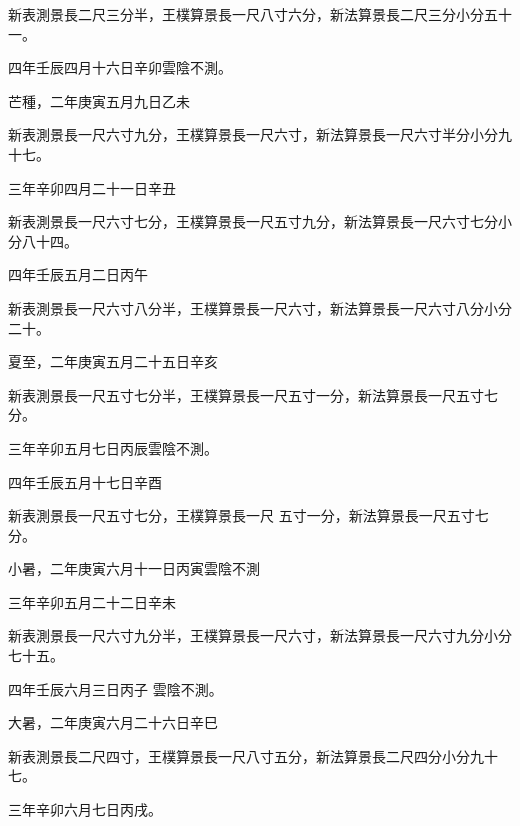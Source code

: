 \begin{pinyinscope}
 新表測景長二尺三分半，王樸算景長一尺八寸六分，新法算景長二尺三分小分五十一。



 四年壬辰四月十六日辛卯雲陰不測。



 芒種，二年庚寅五月九日乙未



 新表測景長一尺六寸九分，王樸算景長一尺六寸，新法算景長一尺六寸半分小分九十七。



 三年辛卯四月二十一日辛丑



 新表測景長一尺六寸七分，王樸算景長一尺五寸九分，新法算景長一尺六寸七分小分八十四。



 四年壬辰五月二日丙午



 新表測景長一尺六寸八分半，王樸算景長一尺六寸，新法算景長一尺六寸八分小分二十。



 夏至，二年庚寅五月二十五日辛亥



 新表測景長一尺五寸七分半，王樸算景長一尺五寸一分，新法算景長一尺五寸七分。



 三年辛卯五月七日丙辰雲陰不測。



 四年壬辰五月十七日辛酉



 新表測景長一尺五寸七分，王樸算景長一尺
 五寸一分，新法算景長一尺五寸七分。



 小暑，二年庚寅六月十一日丙寅雲陰不測



 三年辛卯五月二十二日辛未



 新表測景長一尺六寸九分半，王樸算景長一尺六寸，新法算景長一尺六寸九分小分七十五。



 四年壬辰六月三日丙子
 雲陰不測。



 大暑，二年庚寅六月二十六日辛巳



 新表測景長二尺四寸，王樸算景長一尺八寸五分，新法算景長二尺四分小分九十七。



 三年辛卯六月七日丙戌。




\end{pinyinscope}
